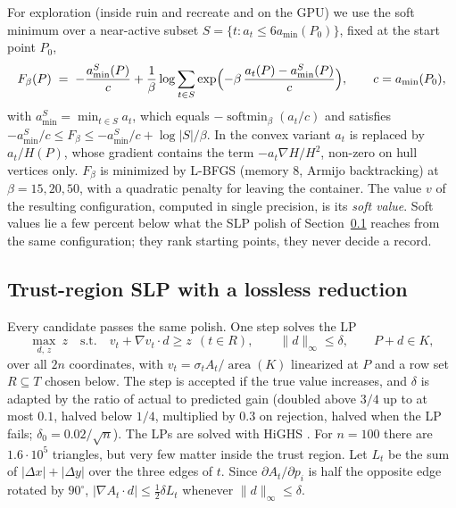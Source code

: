 \documentclass[11pt]{article}
\theoremstyle{remark}
\newcommand{\area}{\operatorname{area}}
\newcommand{\amin}{a_{\min}}
\begin{document}
For exploration (inside ruin and recreate and on the GPU) we use the soft minimum over a near-active subset
$S = \{t : a_t \le 6\amin(P_0)\}$, fixed at the start point $P_0$,
\begin{equation}\label{eq:softmin}
  F_\beta(P) \;=\; -\frac{\amin^S(P)}{c} + \frac1\beta \log \sum_{t \in S} \exp\Bigl(-\beta\,\frac{a_t(P) - \amin^S(P)}{c}\Bigr),
  \qquad c = \amin(P_0),
\end{equation}
with $\amin^S = \min_{t \in S} a_t$, which equals $-\operatorname{softmin}_\beta(a_t/c)$ and satisfies $-\amin^S/c \le F_\beta \le -\amin^S/c + \log|S|/\beta$.
In the convex variant $a_t$ is replaced by $a_t/H(P)$, whose gradient contains the term $-a_t \nabla H / H^2$, non-zero
on hull vertices only. $F_\beta$ is minimized by L-BFGS \cite{LBFGS} (memory $8$, Armijo backtracking) at
$\beta = 15, 20, 50$, with a quadratic penalty for leaving the container. The value $v$ of the resulting
configuration, computed in single precision, is its \emph{soft value}. Soft values lie a few percent below what the SLP
polish of Section~\ref{sec:slp} reaches from the same configuration; they rank starting points, they never decide a
record.

\subsection{Trust-region SLP with a lossless reduction}\label{sec:slp}

Every candidate passes the same polish. One step solves the LP
\begin{equation}\label{eq:slp}
  \max_{d,\,z}\ z \quad\text{s.t.}\quad v_t + \nabla v_t \cdot d \ge z \ \ (t \in R), \qquad \|d\|_\infty \le \delta,
  \qquad P + d \in K,
\end{equation}
over all $2n$ coordinates, with $v_t = \sigma_t A_t/\area(K)$ linearized at $P$ and a row set $R \subseteq T$ chosen
below. The step is accepted if the true value increases, and $\delta$ is adapted by the ratio of actual to predicted
gain (doubled above $3/4$ up to at most $0.1$, halved below $1/4$, multiplied by $0.3$ on rejection, halved when the LP
fails; $\delta_0 = 0.02/\sqrt n$).
The LPs are solved with HiGHS \cite{HiGHS}. For $n = 100$ there are $1.6 \cdot 10^5$ triangles, but very few matter
inside the trust region. Let $L_t$ be the sum of $|\Delta x| + |\Delta y|$ over the three edges of $t$. Since
$\partial A_t / \partial p_i$ is half the opposite edge rotated by $90^\circ$, $|\nabla A_t \cdot d| \le \frac12
\delta L_t$ whenever $\|d\|_\infty \le \delta$.
\end{document}
